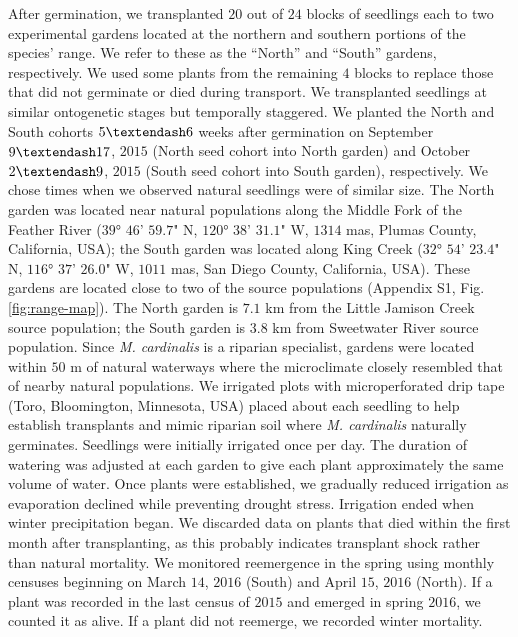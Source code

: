 \documentclass[
  12pt,
]{article}
\begin{document}
After germination, we transplanted \(20\) out of \(24\) blocks of seedlings each to two experimental gardens located at the northern and southern portions of the species' range. We refer to these as the ``North'' and ``South'' gardens, respectively. We used some plants from the remaining \(4\) blocks to replace those that did not germinate or died during transport. We transplanted seedlings at similar ontogenetic stages but temporally staggered. We planted the North and South cohorts \(5 \textendash 6\) weeks after germination on September \(9 \textendash 17\), \(2015\) (North seed cohort into North garden) and October \(2 \textendash 9\), \(2015\) (South seed cohort into South garden), respectively. We chose times when we observed natural seedlings were of similar size. The North garden was located near natural populations along the Middle Fork of the Feather River (\(39\)° \(46\)' \(59.7\)" N, \(120\)° \(38\)' \(31.1\)" W, \(1314\) mas, Plumas County, California, USA); the South garden was located along King Creek (\(32\)° \(54\)' \(23.4\)" N, \(116\)° \(37\)' \(26.0\)" W, \(1011\) mas, San Diego County, California, USA). These gardens are located close to two of the source populations (Appendix S1, Fig. \ref{fig:range-map}). The North garden is \(7.1\) km from the Little Jamison Creek source population; the South garden is \(3.8\) km from Sweetwater River source population. Since \textit{M. cardinalis} is a riparian specialist, gardens were located within \(50\) m of natural waterways where the microclimate closely resembled that of nearby natural populations. We irrigated plots with microperforated drip tape (Toro, Bloomington, Minnesota, USA) placed about each seedling to help establish transplants and mimic riparian soil where \textit{M. cardinalis} naturally germinates. Seedlings were initially irrigated once per day. The duration of watering was adjusted at each garden to give each plant approximately the same volume of water. Once plants were established, we gradually reduced irrigation as evaporation declined while preventing drought stress. Irrigation ended when winter precipitation began. We discarded data on plants that died within the first month after transplanting, as this probably indicates transplant shock rather than natural mortality. We monitored reemergence in the spring using monthly censuses beginning on March \(14\), \(2016\) (South) and April \(15\), \(2016\) (North). If a plant was recorded in the last census of \(2015\) and emerged in spring \(2016\), we counted it as alive. If a plant did not reemerge, we recorded winter mortality.
\end{document}
